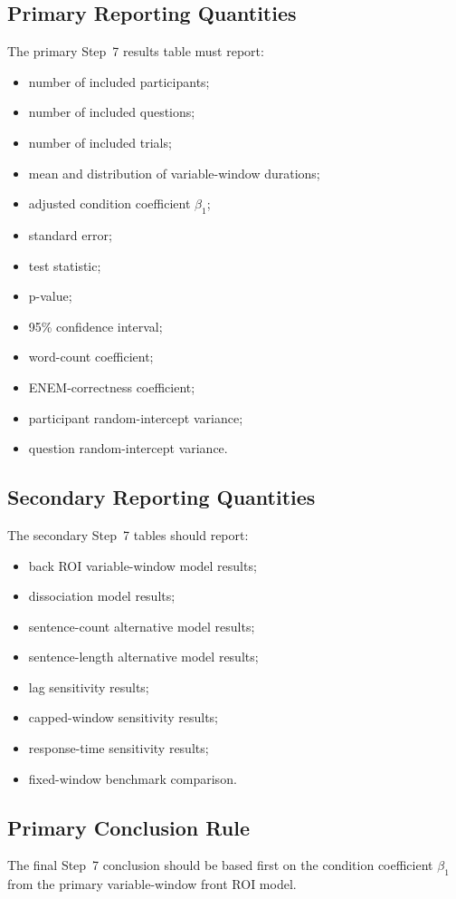 \subsection{Primary Reporting Quantities}
The primary Step~7 results table must report:
\begin{itemize}
    \item number of included participants;
    \item number of included questions;
    \item number of included trials;
    \item mean and distribution of variable-window durations;
    \item adjusted condition coefficient \(\beta_1\);
    \item standard error;
    \item test statistic;
    \item p-value;
    \item 95\% confidence interval;
    \item word-count coefficient;
    \item ENEM-correctness coefficient;
    \item participant random-intercept variance;
    \item question random-intercept variance.
\end{itemize}

\subsection{Secondary Reporting Quantities}
The secondary Step~7 tables should report:
\begin{itemize}
    \item back ROI variable-window model results;
    \item dissociation model results;
    \item sentence-count alternative model results;
    \item sentence-length alternative model results;
    \item lag sensitivity results;
    \item capped-window sensitivity results;
    \item response-time sensitivity results;
    \item fixed-window benchmark comparison.
\end{itemize}

\subsection{Primary Conclusion Rule}
The final Step~7 conclusion should be based first on the condition coefficient \(\beta_1\)
from the primary variable-window front ROI model.

